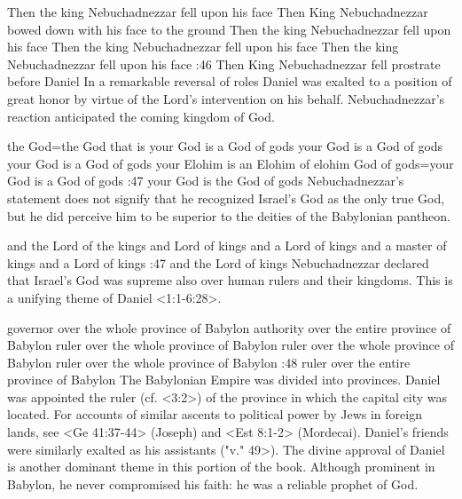     {Then the king Nebuchadnezzar fell upon his face} %
    {Then King Nebuchadnezzar bowed down with his face to the ground} %
    {Then the king Nebuchadnezzar fell upon his face} %
    {Then the king Nebuchadnezzar fell upon his face} %
    {Then the king Nebuchadnezzar fell upon his face} %
:46 {Then King Nebuchadnezzar fell prostrate before Daniel} In a remarkable reversal of roles Daniel
was exalted to a position of great honor by virtue of the Lord's intervention on his
behalf. Nebuchadnezzar's reaction anticipated the coming kingdom  of God.

    {the God}={the God that is your God is a God of gods} %
    {your God is a God of gods} %
    {your God is a God of gods} %
    {your Elohim is an Elohim of elohim} %
    {God of gods}={your God is a God of gods} %
:47 {your God is the God of gods} Nebuchadnezzar's statement 
does not signify that he recognized Israel's God as the only true
God, but he did perceive him to be superior to the deities of the 
Babylonian pantheon. 

    {and the Lord of the kings} %
    {and Lord of kings} %
    {and a Lord of kings} %
    {and a master of kings} %
    {and a Lord of kings} %
:47 {and the Lord of kings}
Nebuchadnezzar 
declared that Israel's God was supreme also over human rulers and 
their kingdoms. This is a unifying theme of Daniel <1:1-6:28>.


    {governor over the whole province of Babylon} %
    {authority over the entire province of Babylon} %
    {ruler over the whole province of Babylon} %
    {ruler over the whole province of Babylon} %
    {ruler over the whole province of Babylon} %
:48 {ruler over the entire province of Babylon} The Babylonian Empire was divided into
provinces. Daniel was appointed the  
ruler (cf. <3:2>) of the province in which the capital city was located. 
For accounts of similar ascents to political power by Jews in foreign 
lands, see <Ge 41:37-44> (Joseph)
and <Est 8:1-2> (Mordecai). 
Daniel's friends were similarly exalted as his assistants (\<"v." 49>). The 
divine approval of Daniel is another dominant theme in this portion of the book. Although prominent
in Babylon, he never compromised his faith: he was a reliable prophet of God.

